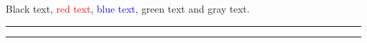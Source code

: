 \documentclass{article}
\begin{document}
Black text, \textcolor{red}{red text}, \textcolor{blue}{blue text},
\textcolor[rgb]{0,0.6,0}{green text} and
{\color[gray]{0.5}gray text}.

\textcolor{red}{\rule{4cm}{3pt}} \textcolor{blue}{\rule{2cm}{3pt}}
\end{document}
